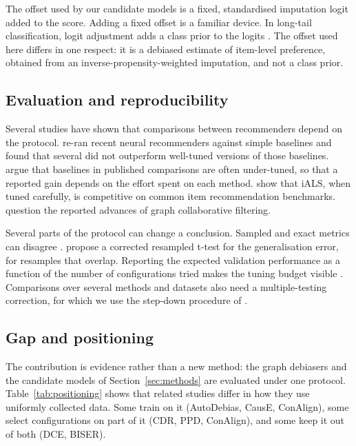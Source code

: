 The offset used by our candidate models is a fixed, standardised imputation logit added to the
score. Adding a fixed offset is a familiar device. In long-tail classification, logit adjustment
adds a class prior to the logits \citep{menon2021logit}. The offset used here differs in one
respect: it is a debiased estimate of item-level preference, obtained from an
inverse-propensity-weighted imputation, and not a class prior.

\subsection{Evaluation and reproducibility}\label{sec:related-eval}

Several studies have shown that comparisons between recommenders depend on the protocol.
\citet{dacrema2019progress} re-ran recent neural recommenders against simple baselines and found
that several did not outperform well-tuned versions of those baselines. \citet{rendle2019baselines}
argue that baselines in published comparisons are often under-tuned, so that a reported gain
depends on the effort spent on each method. \citet{rendle2022ials} show that iALS, when tuned
carefully, is competitive on common item recommendation benchmarks. \citet{anelli2023myth}
question the reported advances of graph collaborative filtering.

Several parts of the protocol can change a conclusion. Sampled and exact metrics can disagree
\citep{krichene2020sampled}. \citet{nadeau2003} propose a corrected resampled t-test for the generalisation error, for
resamples that overlap. Reporting the expected
validation performance as a function of the number of configurations tried makes the tuning
budget visible \citep{dodge2019showyourwork}. Comparisons over several methods and datasets also
need a multiple-testing correction, for which we use the step-down procedure of
\citet{holm1979}.

\subsection{Gap and positioning}\label{sec:related-gap}

The contribution is evidence rather than a new method: the graph debiasers and the candidate models of
Section~\ref{sec:methods} are evaluated under one protocol. Table~\ref{tab:positioning} shows that related studies
differ in how they use uniformly collected data. Some train on it (AutoDebias, CausE, ConAlign), some select
configurations on part of it (CDR, PPD, ConAlign), and some keep it out of both (DCE, BISER).

